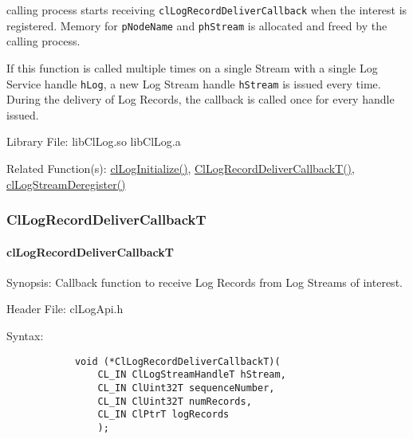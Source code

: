 \begin{flushleft}
\begin{Desc}
calling process starts receiving {\tt{clLogRecordDeliverCallback}} when the interest is registered. Memory for {\tt{pNodeName}} 
and {\tt{phStream}} is allocated and freed by the calling process.
\par
If this function is called multiple times on a single Stream with a single Log Service handle {\tt{hLog}}, a new Log Stream handle 
{\tt{hStream}} is issued every time. During the delivery of Log Records, the callback is called once for every handle issued.
\end{Desc}
\begin{Desc}
\item[Library File:] libClLog.so
\newline
libClLog.a
\end{Desc}
\begin{Desc}
\item[Related Function(s):]\hyperlink{pagelog101}{clLogInitialize()}, \hyperlink{pagelog113}{ClLogRecordDeliverCallbackT()},
\hyperlink{pagelog115}{clLogStreamDeregister()}
\end{Desc}
\newpage



\subsubsection{ClLogRecordDeliverCallbackT}
\hypertarget{pagelog113}{}\paragraph{cl\-Log\-Record\-Deliver\-CallbackT}\label{pagelog113}
\begin{Desc}
\item[Synopsis:] Callback function to receive Log Records from Log Streams of interest.\end{Desc}
\begin{Desc}
\item[Header File:] clLogApi.h \end{Desc}
\begin{Desc}
\item[Syntax:]
\footnotesize\begin{verbatim}        	
			void (*ClLogRecordDeliverCallbackT)(
				CL_IN ClLogStreamHandleT hStream,
				CL_IN ClUint32T sequenceNumber,
				CL_IN ClUint32T numRecords,
				CL_IN ClPtrT logRecords
				);


\end{verbatim}
\end{Desc}
\end{flushleft}
